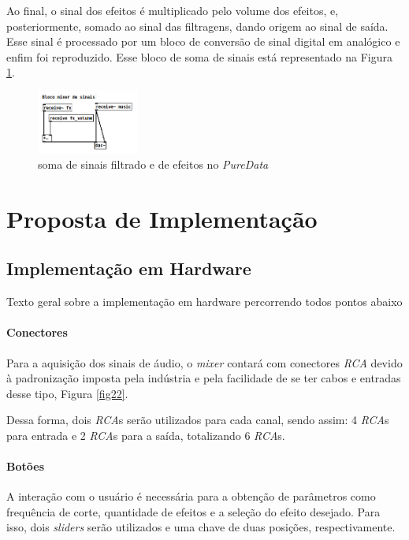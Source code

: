 Ao final, o sinal dos efeitos é multiplicado pelo volume dos efeitos, e, posteriormente, somado ao sinal das filtragens, dando origem ao sinal de saída. Esse sinal é processado por um bloco de conversão de sinal digital em analógico e enfim foi reproduzido. Esse bloco de soma de sinais está representado na Figura \ref{fig51}.

\begin{figure}[h]
    \centering
    \includegraphics[width=0.3\textwidth]{figuras/fig51.png}
    \caption{soma de sinais filtrado e de efeitos no \textit{PureData}}
    \label{fig51}
\end{figure}


\section{Proposta de Implementação}

\subsection{Implementação em Hardware}

Texto geral sobre a implementação em hardware percorrendo todos pontos abaixo

\paragraph{Conectores}
Para a aquisição dos sinais de áudio, o \textit{mixer} contará com conectores \textit{RCA} devido à padronização imposta pela indústria e pela facilidade de se ter cabos e entradas desse tipo, Figura \ref{fig22}.

Dessa forma, dois \textit{RCA}s serão utilizados para cada canal, sendo assim: 4 \textit{RCA}s para entrada e 2 \textit{RCA}s para a saída, totalizando 6 \textit{RCA}s.

\paragraph{Botões}

A interação com o usuário é necessária para a obtenção de parâmetros como frequência de corte, quantidade de efeitos e a seleção do efeito desejado. Para isso, dois \textit{sliders} serão utilizados e uma chave de duas posições, respectivamente. 

